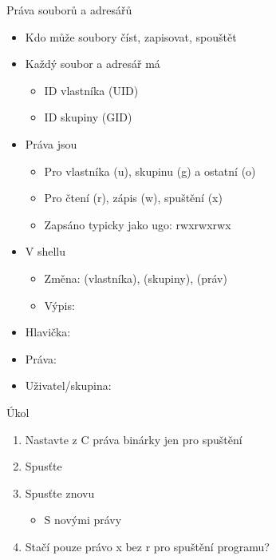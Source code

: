 \begin{frame}{Práva souborů a adresářů}

  \begin{itemize}
    \item Kdo může soubory číst, zapisovat, spouštět

    \pause

    \item Každý soubor a adresář má
    \begin{itemize}
      \item ID vlastníka (UID)
      \item ID skupiny (GID)
    \end{itemize}

    \pause

    \item Práva jsou
    \begin{itemize}
      \item Pro vlastníka (u), skupinu (g) a ostatní (o)
      \item Pro čtení (r), zápis (w), spuštění (x)
      \item Zapsáno typicky jako ugo: rwxrwxrwx
    \end{itemize}

    \pause

    \item V shellu
    \begin{itemize}
      \item Změna:  (vlastníka),  (skupiny),
         (práv)
      \item Výpis: 
    \end{itemize}

    \pause

    \item Hlavička: 
    \item Práva: 
    \item Uživatel/skupina: 

  \end{itemize}

\end{frame}

\begin{frame}{Úkol}

  \begin{enumerate}
    \item Nastavte z C práva binárky  jen pro spuštění
    \item Spusťte
    \item Spusťte znovu
    \begin{itemize}
      \item S novými právy
    \end{itemize}

    \item Stačí pouze právo x bez r pro spuštění programu?
  \end{enumerate}

\end{frame}

